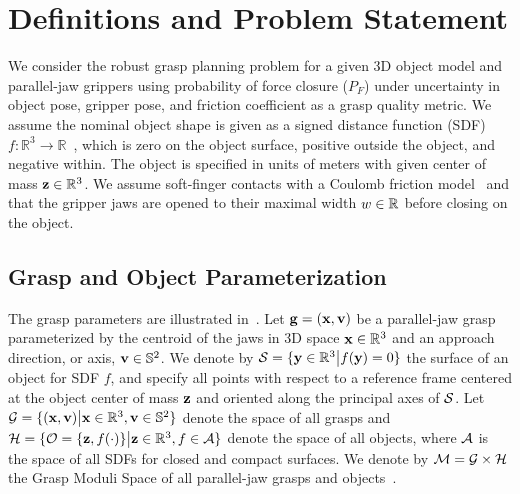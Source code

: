 \section{Definitions and Problem Statement}

We consider the robust grasp planning problem for a given 3D object model and parallel-jaw grippers using probability of force closure ($P_F$)  under uncertainty in object pose, gripper pose, and friction coefficient as a grasp quality metric.
We assume the nominal object shape is given as a signed distance function (SDF) $f: \mathbb{R}^3 \rightarrow \mathbb{R}$~\cite{mahler2015gp}, which is zero on the object surface, positive outside the object, and negative within. 
The object is specified in units of meters with given center of mass $\mathbf{z} \in \mathbb{R}^3$.
We assume soft-finger contacts with a Coulomb friction model~\cite{zheng2005} and that the gripper jaws are opened to their maximal width $w \in\mathbb{R}$ before closing on the object.

\subsection{Grasp and Object Parameterization}
The grasp parameters are illustrated in~.
Let $\mathbf{g} = (\mathbf{x}, \mathbf{v})$ be a parallel-jaw grasp parameterized by the centroid of the jaws in 3D space $\mathbf{x} \in \mathbb{R}^3$ and an approach direction, or axis, $\mathbf{v} \in \mathbb{S}^2$.
We denote by $\mathcal{S} = \{\mathbf{y} \in \mathbb{R}^3 \big| f(\mathbf{y}) = 0\}$ the surface of an object for SDF $f$, and specify all points with respect to a reference frame centered at the object center of mass $\mathbf{z}$ and oriented along the principal axes of $\mathcal{S}$.
Let $\mathcal{G} = \{ (\mathbf{x}, \mathbf{v}) \big| \mathbf{x} \in \mathbb{R}^3, \mathbf{v} \in \mathbb{S}^2\}$ denote the space of all grasps and $\mathcal{H} = \{ \mathcal{O} = \{\mathbf{z}, f(\cdot)\} \big|  \mathbf{z} \in \mathbb{R}^3, f \in \mathcal{A}\}$ denote the space of all objects, where $\mathcal{A}$ is the space of all SDFs for closed and compact surfaces.
We denote by $\mathcal{M} = \mathcal{G} \times \mathcal{H}$ the Grasp Moduli Space of all parallel-jaw grasps and objects~\cite{pokorny2013grasp}.

